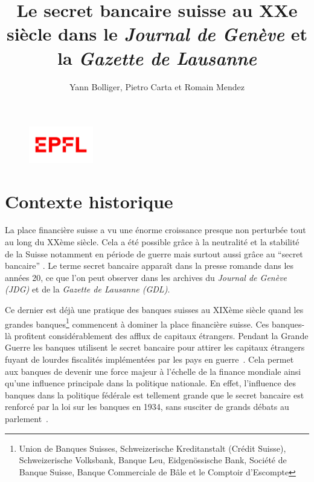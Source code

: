 \documentclass[11pt]{article}
\title{
   Le secret bancaire suisse au XXe siècle dans le
  \textit{Journal de Genève} et la \textit{Gazette de Lausanne}
}
\author{Yann Bolliger, Pietro Carta et Romain Mendez}
\begin{document}
  
\pagestyle{empty}

\begin{figure}
\centering
\includegraphics[width=0.25\textwidth]{logo.png}
\vspace{-1cm}
\end{figure}

\maketitle

\newpage

\pagestyle{fancy}
\section{Contexte historique}

La place financière suisse a vu une énorme croissance presque non perturbée tout
au long du XXème siècle. Cela a été possible grâce à la neutralité et la
stabilité de la Suisse notamment en période de guerre mais surtout aussi grâce
au  ``secret bancaire'' \citep[p. 512]{Mazbouri12}. 
Le terme secret bancaire apparaît dans la presse romande dans les années 20,
ce que l'on peut observer dans les archives du \textit{Journal de Genève (JDG)} et 
de la \textit{Gazette de Lausanne (GDL)}.

Ce dernier est déjà une
pratique des banques suisses au XIXème siècle quand les grandes
banques\footnote{Union de Banques Suisses, Schweizerische Kreditanstalt (Crédit
Suisse), Schweizerische Volksbank, Banque Leu, Eidgenössische Bank, Société de
Banque Suisse, Banque Commerciale de Bâle et le Comptoir d’Escompte} commencent
à dominer la place financière suisse. Ces banques-là profitent considérablement
des afflux de capitaux étrangers. Pendant la Grande Guerre les banques utilisent
le secret bancaire pour attirer les capitaux étrangers fuyant de lourdes
fiscalités implémentées par les pays en guerre~\citep[p. 484-486]{Mazbouri12}.
Cela permet aux banques de devenir une force majeur à l’échelle de la finance
mondiale ainsi qu’une influence principale dans la politique nationale.
En effet, l’influence des banques dans la politique fédérale est tellement
grande que le secret bancaire est renforcé par la loi sur les banques en 1934,
sans susciter de grands débats au parlement~\citep{Guex99}.
\end{document}
